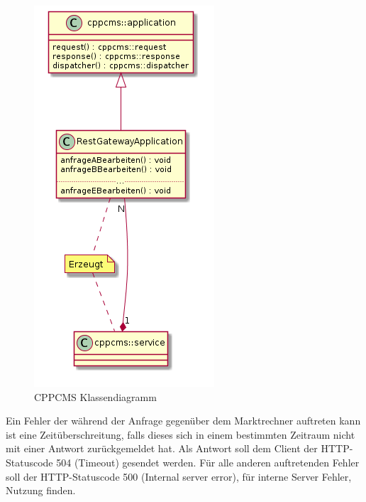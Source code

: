 \documentclass{article}
\begin{document}

\begin{figure}[h]
\centering
\includegraphics[scale=0.5]{praktikumsbericht.png}
\caption{CPPCMS Klassendiagramm}
\label{fig:cppcms_class_diagram}
\end{figure}

Ein Fehler der während der Anfrage gegenüber dem Marktrechner auftreten kann ist eine Zeitüberschreitung, falls dieses sich in einem bestimmten Zeitraum nicht mit einer Antwort zurückgemeldet hat. Als Antwort soll dem Client der HTTP-Statuscode 504 (Timeout) gesendet werden. Für alle anderen auftretenden Fehler soll der HTTP-Statuscode 500 (Internal server error), für interne Server Fehler, Nutzung finden.
\end{document}
